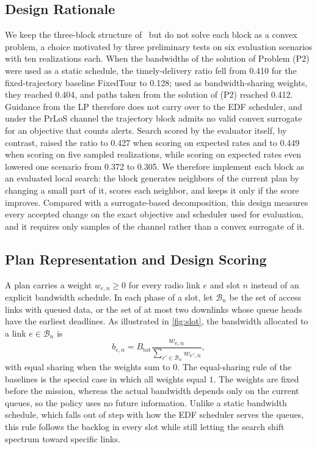 \subsection{Design Rationale}
\label{sec:algorithm}

We keep the three-block structure of~\cite{huang2025ddatsap} but do not solve each block as a convex problem, a choice motivated by three preliminary tests on six evaluation scenarios with ten realizations each. When the bandwidths of the solution of Problem (P2) were used as a static schedule, the timely-delivery ratio fell from \num{0.410} for the fixed-trajectory baseline FixedTour to \num{0.128}; used as bandwidth-sharing weights, they reached \num{0.404}, and paths taken from the solution of (P2) reached \num{0.412}. Guidance from the LP therefore does not carry over to the EDF scheduler, and under the PrLoS channel the trajectory block admits no valid convex surrogate for an objective that counts alerts. Search scored by the evaluator itself, by contrast, raised the ratio to \num{0.427} when scoring on expected rates and to \num{0.449} when scoring on five sampled realizations, while scoring on expected rates even lowered one scenario from \num{0.372} to \num{0.305}. We therefore implement each block as an evaluated local search: the block generates neighbors of the current plan by changing a small part of it, scores each neighbor, and keeps it only if the score improves. Compared with a surrogate-based decomposition, this design measures every accepted change on the exact objective and scheduler used for evaluation, and it requires only samples of the channel rather than a convex surrogate of it.

\subsection{Plan Representation and Design Scoring}
\label{sec:weights}

A plan carries a weight $w_{e,n}\ge 0$ for every radio link $e$ and slot $n$ instead of an explicit bandwidth schedule. In each phase of a slot, let $\mathcal B_n$ be the set of access links with queued data, or the set of at most two downlinks whose queue heads have the earliest deadlines. As illustrated in \cref{fig:slot}, the bandwidth allocated to a link $e\in\mathcal B_n$ is
\begin{equation}
\label{eq:weights}
b_{e,n}=B_{\mathrm{tot}}\frac{w_{e,n}}{\sum_{e'\in\mathcal B_n}w_{e',n}},
\end{equation}
\noindent with equal sharing when the weights sum to $0$. The equal-sharing rule of the baselines is the special case in which all weights equal $1$. The weights are fixed before the mission, whereas the actual bandwidth depends only on the current queues, so the policy uses no future information. Unlike a static bandwidth schedule, which falls out of step with how the EDF scheduler serves the queues, this rule follows the backlog in every slot while still letting the search shift spectrum toward specific links.

